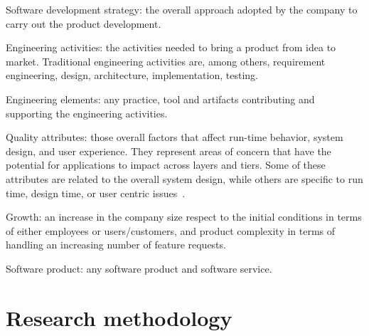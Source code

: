 \documentclass[10pt,journal,letterpaper,compsoc]{IEEEtran}
\begin{document}
\begin{compactitem} 
\item Software development strategy: the overall approach adopted by the 
company to carry out the product development. 
\item Engineering activities: the activities needed to bring a product from 
idea to market. Traditional engineering activities are, among others, 
requirement engineering, design, architecture, implementation, testing. 
\item Engineering elements: any practice, tool and artifacts contributing and 
supporting the engineering activities.
\item Quality attributes: those overall factors that affect run-time
behavior, system design, and user experience. They represent areas of concern
that have the potential for applications to impact across layers and tiers.
Some of these attributes are related to the overall system design, while others
are specific to run time, design time, or user centric 
issues~\cite{Microsoft2009}. 
\item Growth: an increase in the company size respect to the initial 
conditions in terms of either employees or users/customers, and
product complexity in terms of handling an increasing number of feature
requests. 
\item Software product: any software product and software service.
\end{compactitem}

\section{Research methodology} \label{resmet}
\end{document}
